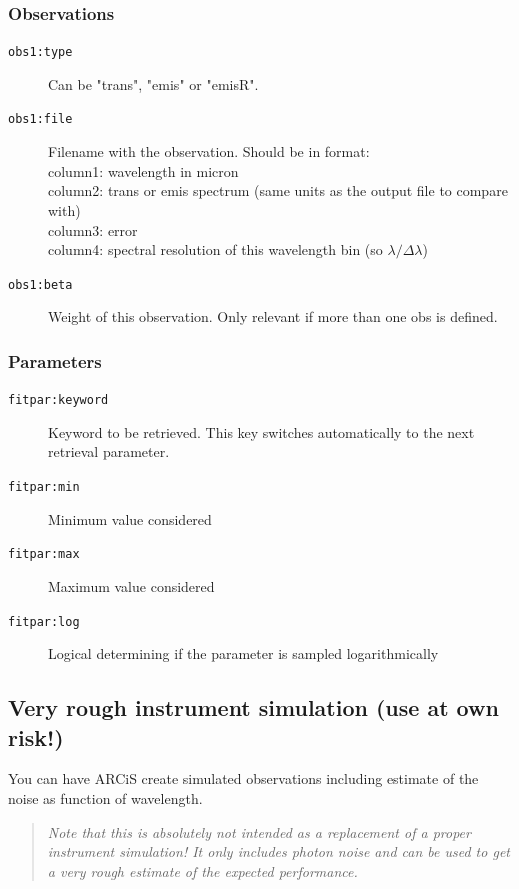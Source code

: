 \documentclass[12pt]{article}
\begin{document}
\subsubsection{Observations}

\begin{description}
\item[\texttt{obs1:type}]
Can be "trans", "emis" or "emisR".
\item[\texttt{obs1:file}]
Filename with the observation. Should be in format:\\
column1: wavelength in micron\\
column2: trans or emis spectrum (same units as the output file to compare with)\\
column3: error\\
column4: spectral resolution of this wavelength bin (so $\lambda/\Delta\lambda$)
\item[\texttt{obs1:beta}]
Weight of this observation. Only relevant if more than one obs is defined.
\end{description}

\subsubsection{Parameters}

\begin{description}
\item[\texttt{fitpar:keyword}]
Keyword to be retrieved. This key switches automatically to the next retrieval parameter.
\item[\texttt{fitpar:min}]
Minimum value considered
\item[\texttt{fitpar:max}]
Maximum value considered
\item[\texttt{fitpar:log}]
Logical determining if the parameter is sampled logarithmically
\end{description}

\subsection{Very rough instrument simulation (use at own risk!)}

You can have ARCiS create simulated observations including estimate of the noise as function of wavelength. 
\begin{quote}
\emph{Note that this is absolutely not intended as a replacement of a proper instrument simulation! It only includes photon noise and can be used to get a very rough estimate of the expected performance.}
\end{quote}
\end{document}
